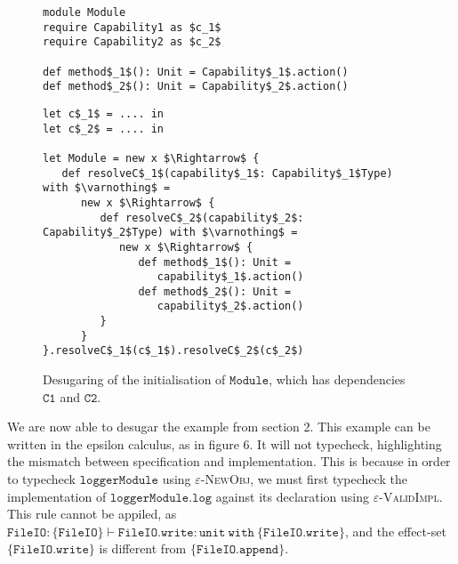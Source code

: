\documentclass[a4paper,UKenglish]{lipics-v2016}
\newcommand{\kw}[1]{\mathtt{ #1 }~}
\newcommand{\kwa}[1]{\mathtt{ #1 }}
\begin{document}
\begin{figure}[h]
\begin{lstlisting}[mathescape]
module Module
require Capability1 as $c_1$
require Capability2 as $c_2$

def method$_1$(): Unit = Capability$_1$.action()
def method$_2$(): Unit = Capability$_2$.action()
\end{lstlisting}

\begin{lstlisting}[mathescape]
let c$_1$ = .... in
let c$_2$ = .... in

let Module = new x $\Rightarrow$ {
   def resolveC$_1$(capability$_1$: Capability$_1$Type) with $\varnothing$ =
      new x $\Rightarrow$ {
         def resolveC$_2$(capability$_2$: Capability$_2$Type) with $\varnothing$ =
            new x $\Rightarrow$ {
               def method$_1$(): Unit =
                  capability$_1$.action()
               def method$_2$(): Unit =
                  capability$_2$.action()
         }
      }
}.resolveC$_1$(c$_1$).resolveC$_2$(c$_2$)

\end{lstlisting}

\vspace{-7pt}
\caption{Desugaring of the initialisation of $\kwa{Module}$, which has dependencies $\kwa{C1}$ and $\kwa{C2}$.}
\end{figure}

\noindent
We are now able to desugar the example from section 2. This example can be written in the epsilon calculus, as in figure 6. It will not typecheck, highlighting the mismatch between specification and implementation. This is because in order to typecheck $\kwa{loggerModule}$ using \textsc{$\varepsilon$-NewObj}, we must first typecheck the implementation of $\kwa{loggerModule.log}$ against its declaration using \textsc{$\varepsilon$-ValidImpl}. This rule cannot be appiled, as $\kwa{FileIO} : \{ \kwa{FileIO} \} \vdash \kwa{FileIO.write} : \kwa{unit} ~\kw{with} \{ \kwa{FileIO.write} \}$, and the effect-set $\{ \kwa{FileIO.write} \}$ is different from $\{ \kwa{FileIO.append} \}$.
\end{document}
